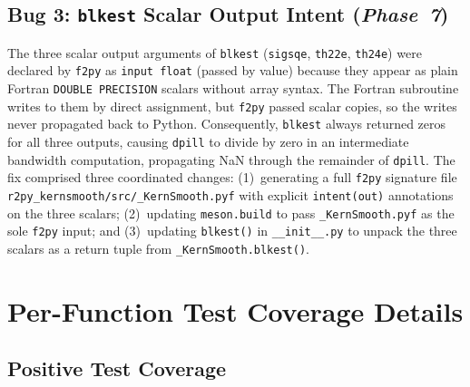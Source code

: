 \documentclass[12pt,a4paper]{article}
\newcommand{\pkg}[1]{\texttt{#1}}
\begin{document}
\subsection{Bug 3: \texttt{blkest} Scalar Output Intent (\textit{Phase~7})}

The three scalar output arguments of \texttt{blkest} (\texttt{sigsqe}, \texttt{th22e}, \texttt{th24e}) were declared by \pkg{f2py} as \texttt{input float} (passed by value) because they appear as plain Fortran \texttt{DOUBLE PRECISION} scalars without array syntax. The Fortran subroutine writes to them by direct assignment, but \pkg{f2py} passed scalar copies, so the writes never propagated back to Python. Consequently, \texttt{blkest} always returned zeros for all three outputs, causing \texttt{dpill} to divide by zero in an intermediate bandwidth computation, propagating NaN through the remainder of \texttt{dpill}. The fix comprised three coordinated changes: (1)~generating a full \pkg{f2py} signature file \texttt{r2py\_kernsmooth/src/\_KernSmooth.pyf} with explicit \texttt{intent(out)} annotations on the three scalars; (2)~updating \texttt{meson.build} to pass \texttt{\_KernSmooth.pyf} as the sole \pkg{f2py} input; and (3)~updating \texttt{blkest()} in \texttt{\_\_init\_\_.py} to unpack the three scalars as a return tuple from \texttt{\_KernSmooth.blkest()}.

\section{Per-Function Test Coverage Details}
\label{supp:tests}

\subsection{Positive Test Coverage}
\end{document}
